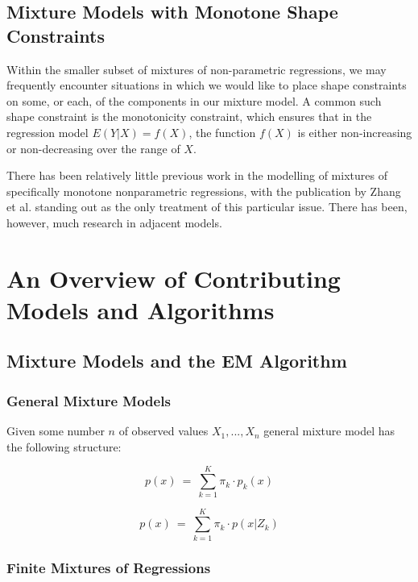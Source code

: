 \documentclass[fleqn,10pt]{olplainarticle}\usepackage[]{graphicx}\usepackage[]{color}
\begin{document}
\subsection{Mixture Models with Monotone Shape Constraints}

Within the smaller subset of mixtures of non-parametric regressions, we may frequently encounter situations in which we would like to place shape constraints on some, or each, of the components in our mixture model. A common such shape constraint is the monotonicity constraint, which ensures that in the regression model \( E(Y|X) = f(X) \), the function $f(X)$ is either non-increasing or non-decreasing over the range of $X$.

There has been relatively little previous work in the modelling of mixtures of specifically monotone nonparametric regressions, with the publication by Zhang et al. standing out as the only treatment of this particular issue. There has been, however, much research in adjacent models.


\section{An Overview of Contributing Models and Algorithms}

\subsection{Mixture Models and the EM Algorithm}

\subsubsection{General Mixture Models}

Given some number $n$ of observed values $X_1,...,X_n$ general mixture model has the following structure:

\begin{equation} \label{genmix}
  p(x) \ =\ \sum_{k=1}^{K} \pi_k \cdot p_k(x)
\end{equation}

\begin{equation} \label{genmixlatent}
  p(x) \ =\ \sum_{k=1}^{K} \pi_k \cdot p(x | Z_k)
\end{equation}

\subsubsection{Finite Mixtures of Regressions}
\end{document}
